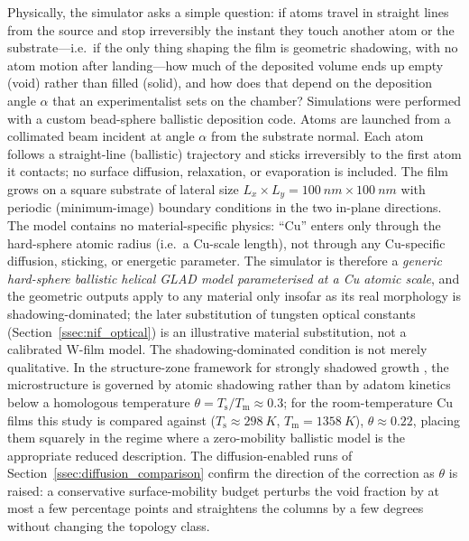 \documentclass[aip,amsmath,amssymb,reprint]{revtex4-1}
\newcommand{\dang}{\ensuremath{\alpha}}
\begin{document}
Physically, the simulator asks a simple question: if atoms travel in
straight lines from the source and stop irreversibly the instant they
touch another atom or the substrate---i.e.\ if the only thing shaping the
film is geometric shadowing, with no atom motion after landing---how much
of the deposited volume ends up empty (void) rather than filled (solid),
and how does that depend on the deposition angle $\dang$ that an
experimentalist sets on the chamber? Simulations were performed with a
custom bead-sphere ballistic deposition code.  Atoms are launched from a collimated beam
incident at angle $\dang$ from the substrate normal.  Each atom follows
a straight-line (ballistic) trajectory and sticks irreversibly to the
first atom it contacts; no surface diffusion, relaxation, or
evaporation is included.  The film grows on a square substrate of
lateral size $L_x \times L_y = \SI{100}{nm} \times \SI{100}{nm}$ with
periodic (minimum-image) boundary conditions in the two in-plane
directions.
The model contains no material-specific physics: ``Cu'' enters only through
the hard-sphere atomic radius (i.e.\ a Cu-scale length), not through any
Cu-specific diffusion, sticking, or energetic parameter.  The simulator is
therefore a \emph{generic hard-sphere ballistic helical GLAD model
parameterised at a Cu atomic scale}, and the geometric outputs apply to any
material only insofar as its real morphology is shadowing-dominated; the
later substitution of tungsten optical constants (Section~\ref{ssec:nif_optical})
is an illustrative material substitution, not a calibrated W-film model.
The shadowing-dominated condition is not merely qualitative. In the
structure-zone framework for strongly shadowed growth \citep{mukherjee2013szm},
the microstructure is governed by atomic shadowing rather than by adatom
kinetics below a homologous temperature $\theta = T_{\mathrm{s}}/T_{\mathrm{m}}
\approx 0.3$; for the room-temperature Cu films this study is compared against
($T_{\mathrm{s}}\approx\SI{298}{K}$, $T_{\mathrm{m}}=\SI{1358}{K}$),
$\theta\approx 0.22$, placing them squarely in the regime where a
zero-mobility ballistic model is the appropriate reduced description.  The
diffusion-enabled runs of Section~\ref{ssec:diffusion_comparison} confirm the
direction of the correction as $\theta$ is raised: a conservative surface-mobility
budget perturbs the void fraction by at most a few percentage points and
straightens the columns by a few degrees without changing the topology class.
\end{document}

